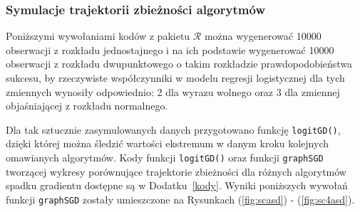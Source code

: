 \newpage
\subsubsection{Symulacje trajektorii zbieżności algorytmów}
Poniższymi wywołaniami kodów z pakietu $\mathcal{R}$ \cite{programikr} można wygenerować 10000 obserwacji z rozkładu jednostajnego i na ich podstawie wygenerować 10000 obserwacji z rozkładu dwupunktowego o takim rozkładzie prawdopodobieństwa sukcesu, by rzeczywiste współczynniki w modelu regresji logistycznej dla tych zmiennych wynosiły odpowiednio: 2 dla wyrazu wolnego oraz 3 dla zmiennej objaśniającej z rozkładu normalnego. 
\begin{Shaded}
\begin{Highlighting}[]
\StringTok{ }\NormalTok{(}\NormalTok{)}
\StringTok{ } \NormalTok{+}\StringTok{ }
\StringTok{ }\NormalTok{/(}\NormalTok{+}
\StringTok{ }\NormalTok{(}\NormalTok{,}
\end{Highlighting}
\end{Shaded}

Dla tak sztucznie zasymulowanych danych przygotowano funkcję \texttt{logitGD()}, dzięki której można śledzić wartości ekstremum w danym kroku kolejnych omawianych algorytmów. Kody funkcji \texttt{logitGD()} oraz funkcji \texttt{graphSGD} tworzącej wykresy porównujące trajektorie zbieżności dla różnych algorytmów spadku gradientu  dostępne są w Dodatku~\ref{kody}. Wyniki poniższych wywołań funkcji \texttt{graphSGD} zostały umieszczone na Rysunkach (\ref{fig:scasd}) - (\ref{fig:sc4asd}).

\begin{Shaded}
\begin{Highlighting}[]
\NormalTok{(}\NormalTok{(}\NormalTok{,}\NormalTok{);}\NormalTok{(}\NormalTok{(}\NormalTok{,}\NormalTok{)}
\NormalTok{(}\NormalTok{(}\NormalTok{,}\NormalTok{);}\NormalTok{(}\NormalTok{(}\NormalTok{,}\NormalTok{)}
\NormalTok{(}\NormalTok{(}\NormalTok{,}\NormalTok{);}\NormalTok{(}\NormalTok{(}\NormalTok{,}\NormalTok{)}
\NormalTok{(}\NormalTok{(}\NormalTok{,}\NormalTok{);}\NormalTok{(}\NormalTok{(}\NormalTok{,}\NormalTok{)}
\end{Highlighting}
\end{Shaded}

